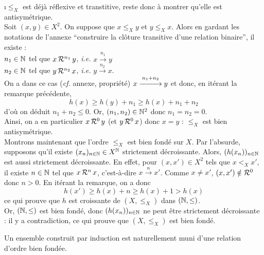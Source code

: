 			\begin{Preuve}
				\i \(\leqslant_X\) est déjà réflexive et transtitive, reste donc à montrer qu'elle est antisymétrique. \\[2mm]
					Soit \((x,y) \in X^2\). On suppose que \(x \leqslant_X y\) et \(y \leqslant_X x\). Alors en gardant les notations de l'annexe ``construire la clôture transitive d'une relation binaire'', il existe : \\
						 \bdot \(n_1\in\bb{N}\) tel que \(x \,\cal{R}^{n_1}\, y\), \emph{i.e.} \(x \overset{n_1}{\longrightarrow} y\) \\
						 \bdot \(n_2\in\bb{N}\) tel que \(y \,\cal{R}^{n_2}\, x\), \emph{i.e.} \(y \overset{n_2}{\longrightarrow} x\). \\
					On a dans ce cas (\emph{cf.} annexe, propriété) \(x \overset{n_1+n_2}{\xrightarrow{\hspace*{9mm}}} y\) et donc, en itérant la remarque précédente,
						\[
							h(x) \geq h(y) + n_1 \geq h(x) + n_1 + n_2
						\]
					d'où on déduit \(n_1+n_2 \leq 0\). Or, \((n_1,n_2)\in\bb{N}^2\) donc \(n_1=n_2=0\). \\
					Ainsi, on a en particulier \(x \,\cal{R}^0\, y\) (et \(y \,\cal{R}^0 \,x\)) donc \(x=y\) : \(\leqslant_X\) est bien antisymétrique. \\[3mm]
				\ii Montrons maintenant que l'ordre \(\leqslant_X\) est bien fondé sur \(X\). \nt
					Par l'absurde, supposons qu'il existe \((x_n)_{n\in\bb{N}} \in X^\bb{N}\) strictement décroissante. Alors, \((h(x_n))_{n\in\bb{N}}\) est aussi strictement décroissante. \nt
					En effet, pour \((x,x')\in X^2\) tels que \(x<_X x'\), il existe \(n\in\bb{N}\) tel que \(x \,\cal{R}^n\, x\), c'est-à-dire \(x \overset{n}{\longrightarrow} x'\). Comme \(x \neq x'\), \((x,x') \notin \cal{R}^0\) donc \(n>0\). En itérant la remarque, on a donc
						\[
							h(x') \geq h(x) + n \geq h(x)+1 > h(x)
						\]
					ce qui prouve que \(h\) est croissante de \((X,\leqslant_X)\) dans \((\bb{N},\leq)\). \\[2mm]
					Or, \((\bb{N},\leq)\) est bien fondé, donc \((h(x_n))_{n\in\bb{N}}\) ne peut être strictement décroissante : il y a contradiction, ce qui prouve que \((X,\leqslant_X)\) est bien fondé.
			\end{Preuve}
			
			\begin{Aretenir}
				Un ensemble construit par induction est naturellement muni d'une relation d'ordre bien fondée.
			\end{Aretenir}
			
